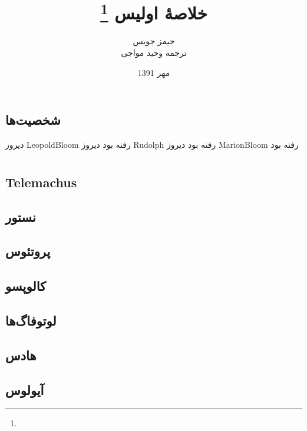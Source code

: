 \documentclass[12pt,onecolumn,a4paper]{book}
\begin{document}
    \title{خلاصۀ اولیس \footnote{}}
    \author{جیمز جویس\\
    ترجمه وحید مواجی
    }
    \date{مهر 1391}
    \frontmatter                            %
    \maketitle                              %
    \tableofcontents                        %
    \mainmatter


    \part{}
    \chapter{شخصیت‌ها}
    دیروز \gls{LeopoldBloom} رفته بود
    دیروز \gls{Rudolph} رفته بود
    دیروز \gls{MarionBloom} رفته بود

    \part{}
    \chapter[\glsentryname{Telemachus}]{\gls{Telemachus}}

    \chapter{نستور}
    \chapter{پروتئوس}
    \chapter{کالوپسو}
    \chapter{لوتوفاگ‌ها}
    \chapter{هادس}
    \chapter{آیولوس}
\end{document}
